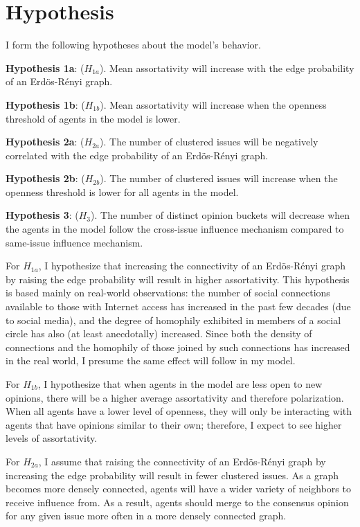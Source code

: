 \section{Hypothesis}
I form the following hypotheses about the model's behavior.

\textbf{Hypothesis 1a}: ($H_{1a}$). Mean assortativity will increase with the
edge probability of an Erd\"{o}s-R\'{e}nyi graph.

\textbf{Hypothesis 1b}: ($H_{1b}$). Mean assortativity will increase when the
openness threshold of agents in the model is lower.

\textbf{Hypothesis 2a}: ($H_{2a}$). The number of clustered issues will be
negatively correlated with the edge probability of an Erd\"{o}s-R\'{e}nyi
graph.

\textbf{Hypothesis 2b}: ($H_{2b}$). The number of clustered issues will
increase when the openness threshold is lower for all agents in the model.

\textbf{Hypothesis 3}: ($H_{3}$). The number of distinct opinion buckets will
decrease when the agents in the model follow the cross-issue influence mechanism compared to same-issue influence mechanism.


For $H_{1a}$, I hypothesize that increasing the connectivity of an
Erd\"o{s}-R\'{e}nyi graph by raising the edge probability will result in higher
assortativity. This hypothesis is based mainly on real-world observations: the
number of social connections available to those with Internet access has
increased in the past few decades (due to social media\cite{dean_how_2021}),
and the degree of homophily exhibited in members of a social circle has also
(at least anecdotally) increased. Since both the density of connections and the
homophily of those joined by such connections has increased in the real world,
I presume the same effect will follow in my model.

For $H_{1b}$, I hypothesize that when agents in the model are less open to new
opinions, there will be a higher average assortativity and therefore
polarization. When all agents have a lower level of openness, they will only be
interacting with agents that have opinions similar to their own; therefore, I
expect to see higher levels of assortativity. 

For $H_{2a}$, I assume that raising the connectivity of an Erd\"o{s}-R\'{e}nyi
graph by increasing the edge probability will result in fewer clustered issues.
As a graph becomes more densely connected, agents will have a wider variety of
neighbors to receive influence from. As a result, agents should merge to the
consensus opinion for any given issue more often in a more densely connected
graph. 

